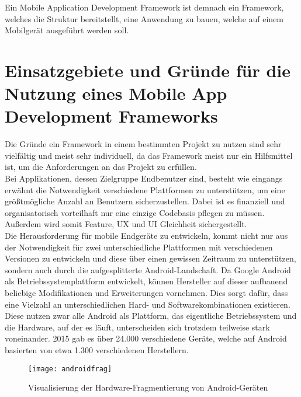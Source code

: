 Ein Mobile Application Development Framework ist demnach ein Framework, welches die Struktur bereitstellt, eine Anwendung zu bauen, welche auf einem Mobilgerät ausgeführt werden soll.

\newpage
\section{Einsatzgebiete und Gründe für die Nutzung eines Mobile App Development Frameworks}

Die Gründe ein Framework in einem bestimmten Projekt zu nutzen sind sehr vielfältig und meist sehr individuell, da das Framework meist nur ein Hilfsmittel ist, um die Anforderungen an das Projekt zu erfüllen.\\

Bei Applikationen, dessen Zielgruppe Endbenutzer sind, besteht wie eingangs erwähnt die Notwendigkeit verschiedene Plattformen zu unterstützen, um eine größtmögliche Anzahl an Benutzern sicherzustellen. Dabei ist es finanziell und organisatorisch vorteilhaft nur eine einzige Codebasis pflegen zu müssen. Außerdem wird somit Feature, \ac{UX} und \ac{UI} Gleichheit sichergestellt.\cite{rieger_evaluation}\\

Die Herausforderung für mobile Endgeräte zu entwickeln, kommt nicht nur aus der Notwendigkeit für zwei unterschiedliche Plattformen mit verschiedenen Versionen zu entwickeln und diese über einen gewissen Zeitraum zu unterstützen, sondern auch durch die aufgesplitterte Android-Landschaft. Da Google Android als Betriebssystemplattform entwickelt, können Hersteller auf dieser aufbauend beliebige Modifikationen und Erweiterungen vornehmen\cite{andriod1}. Dies sorgt dafür, dass eine Vielzahl an unterschiedlichen Hard- und Softwarekombinationen existieren. Diese nutzen zwar alle Android als Plattform, das eigentliche Betriebssystem und die Hardware, auf der es läuft, unterscheiden sich trotzdem teilweise stark voneinander. 2015 gab es über 24.000 verschiedene Geräte, welche auf Android basierten von etwa 1.300 verschiedenen Herstellern\cite{opensignal1}.

\begin{figure}[h]
	\texttt{[image: androidfrag]}
	\centering
	\caption[Visualisierung der Hardware-Fragmentierung von Android-Geräten]{Visualisierung der Hardware-Fragmentierung von Android-Geräten \cite{opensignal1}}
\end{figure}

